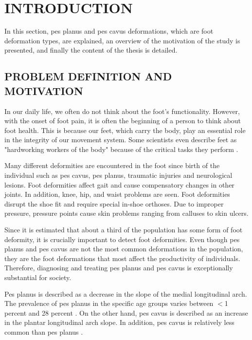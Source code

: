 \chapter{INTRODUCTION}

In this section, pes planus and pes cavus deformations, which are foot deformation types, are explained, an overview of the motivation of the study is presented, and finally the content of the thesis is detailed.

\section{PROBLEM DEFINITION AND MOTIVATION}

In our daily life, we often do not think about the foot's functionality. However, with the onset of foot pain, it is often the beginning of a person to think about foot health. This is because our feet, which carry the body, play an essential role in the integrity of our movement system. Some scientists even describe feet as "hardworking workers of the body" because of the critical tasks they perform \cite{veli2004shoes}.

Many different deformities are encountered in the foot since birth of the individual such as pes cavus, pes planus, traumatic injuries and neurological lesions. Foot deformities affect gait and cause compensatory changes in other joints. In addition, knee, hip, and waist problems are seen. Foot deformities disrupt the shoe fit and require special in-shoe orthoses. Due to improper pressure, pressure points cause skin problems ranging from calluses to skin ulcers.

Since it is estimated that about a third of the population has some form of foot deformity, it is crucially important to detect foot deformities. Even though pes planus and pes cavus are not the most common deformations in the population, they are the foot deformations that most affect the productivity of individuals. Therefore, diagnosing and treating pes planus and pes cavus is exceptionally substantial for society.

Pes planus is described as a decrease in the slope of the medial longitudinal arch. The prevalence of pes planus in the specific age groups varies between $<$1 percent and 28 percent \cite{ccilli2009prevalence, pfeiffer2006prevalence, abdel2006flat, chen2009flatfoot}. On the other hand, pes cavus is described as an increase in the plantar longitudinal arch slope. In addition, pes cavus is relatively less common than pes planus \cite{kharbuja2017prevalence}.

